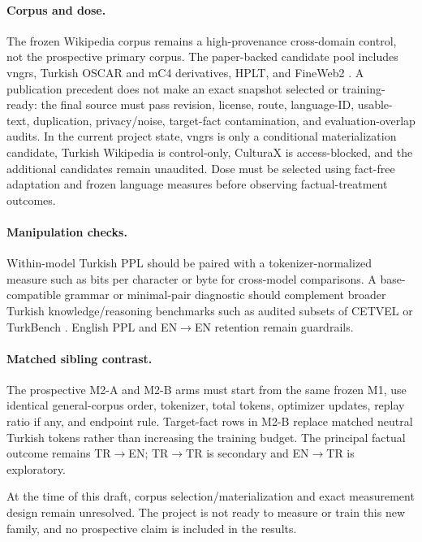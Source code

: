 \documentclass[10pt,a4paper,twocolumn]{article}
\newcommand{\mone}{M1}
\newcommand{\mta}{M2-A}
\newcommand{\mtb}{M2-B}
\newcommand{\trtoen}{TR$\rightarrow$EN}
\newcommand{\enttoen}{EN$\rightarrow$EN}
\newcommand{\trtotr}{TR$\rightarrow$TR}
\begin{document}
\paragraph{Corpus and dose.}
The frozen Wikipedia corpus remains a high-provenance cross-domain control, not the prospective primary corpus. The paper-backed candidate pool includes vngrs, Turkish OSCAR and mC4 derivatives, HPLT, and FineWeb2 \citep{toraman2023tokenization,turker2024vbart,schmitt2026sindbert,arefyev2024hplt,penedo2025fineweb2}. A publication precedent does not make an exact snapshot selected or training-ready: the final source must pass revision, license, route, language-ID, usable-text, duplication, privacy/noise, target-fact contamination, and evaluation-overlap audits. In the current project state, vngrs is only a conditional materialization candidate, Turkish Wikipedia is control-only, CulturaX is access-blocked, and the additional candidates remain unaudited. Dose must be selected using fact-free adaptation and frozen language measures before observing factual-treatment outcomes.

\paragraph{Manipulation checks.}
Within-model Turkish PPL should be paired with a tokenizer-normalized measure such as bits per character or byte for cross-model comparisons. A base-compatible grammar or minimal-pair diagnostic should complement broader Turkish knowledge/reasoning benchmarks such as audited subsets of CETVEL or TurkBench \citep{er2026cetvel,toraman2026turkbench}. English PPL and \enttoen{} retention remain guardrails.

\paragraph{Matched sibling contrast.}
The prospective \mta{} and \mtb{} arms must start from the same frozen \mone{}, use identical general-corpus order, tokenizer, total tokens, optimizer updates, replay ratio if any, and endpoint rule. Target-fact rows in \mtb{} replace matched neutral Turkish tokens rather than increasing the training budget. The principal factual outcome remains \trtoen{}; \trtotr{} is secondary and EN$\rightarrow$TR is exploratory.

At the time of this draft, corpus selection/materialization and exact measurement design remain unresolved. The project is not ready to measure or train this new family, and no prospective claim is included in the results.
\end{document}
